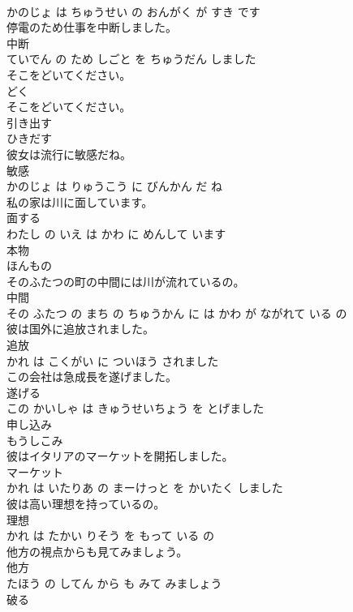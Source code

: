 \documentclass[8pt]{extreport}
\begin{document}
\begin{CJK}{UTF8}{min}
\\	かのじょ は ちゅうせい の おんがく が すき です			
\\	停電のため仕事を中断しました。	
\\	中断 
\\	ていでん の ため しごと を ちゅうだん しました			
\\	そこをどいてください。	
\\	どく 
\\	そこをどいてください。			
\\	引き出す	
\\	ひきだす		
\\	彼女は流行に敏感だね。	
\\	敏感 
\\	かのじょ は りゅうこう に びんかん だ ね			
\\	私の家は川に面しています。	
\\	面する 
\\	わたし の いえ は かわ に めんして います			
\\	本物	
\\	ほんもの		
\\	そのふたつの町の中間には川が流れているの。	
\\	中間 
\\	その ふたつ の まち の ちゅうかん に は かわ が ながれて いる の			
\\	彼は国外に追放されました。	
\\	追放 
\\	かれ は こくがい に ついほう されました			
\\	この会社は急成長を遂げました。	
\\	遂げる 
\\	この かいしゃ は きゅうせいちょう を とげました			
\\	申し込み	
\\	もうしこみ		
\\	彼はイタリアのマーケットを開拓しました。	
\\	マーケット 
\\	かれ は いたりあ の まーけっと を かいたく しました			
\\	彼は高い理想を持っているの。	
\\	理想 
\\	かれ は たかい りそう を もって いる の			
\\	他方の視点からも見てみましょう。	
\\	他方 
\\	たほう の してん から も みて みましょう			
\\	破る	

\end{CJK}
\end{document}
